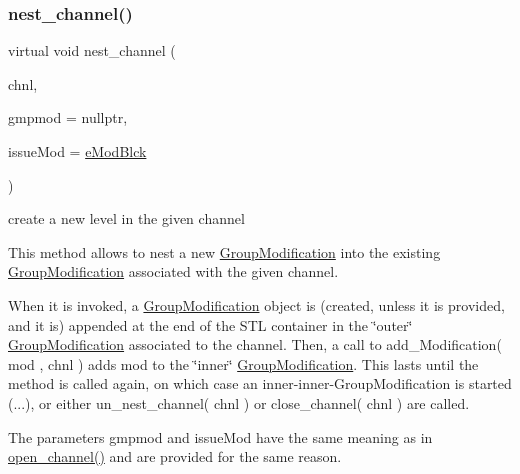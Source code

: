 \subsubsection{\texorpdfstring{nest\+\_\+channel()}{nest\_channel()}}
{\footnotesize\ttfamily virtual void nest\+\_\+channel (\begin{DoxyParamCaption}\item[{\mbox{\hyperlink{class_s_m_spp__di__unipi__it_1_1_observer_aa9ad8de42ffaf90023bfed5c085ad8bc}{c\+\_\+\+Chnl\+Name}}}]{chnl,  }\item[{\mbox{\hyperlink{class_s_m_spp__di__unipi__it_1_1_group_modification}{Group\+Modification}} $\ast$}]{gmpmod = {\ttfamily nullptr},  }\item[{\mbox{\hyperlink{group___modification___t_y_p_e_s_ga544246d8c462e9a2d817c2c30797968f}{c\+\_\+\+Mod\+Param}}}]{issue\+Mod = {\ttfamily \mbox{\hyperlink{group___modification___t_y_p_e_s_gga48fddcdd03a03f49b7e389ca1ed938d4a21b14b26b1c0093a0905f6fc010bad29}{e\+Mod\+Blck}}} }\end{DoxyParamCaption})\hspace{0.3cm}{\ttfamily [pure virtual]}}



create a new level in the given channel 

This method allows to nest a new \mbox{\hyperlink{class_s_m_spp__di__unipi__it_1_1_group_modification}{Group\+Modification}} into the existing \mbox{\hyperlink{class_s_m_spp__di__unipi__it_1_1_group_modification}{Group\+Modification}} associated with the given channel.

When it is invoked, a \mbox{\hyperlink{class_s_m_spp__di__unipi__it_1_1_group_modification}{Group\+Modification}} object is (created, unless it is provided, and it is) appended at the end of the S\+TL container in the \char`\"{}outer\char`\"{} \mbox{\hyperlink{class_s_m_spp__di__unipi__it_1_1_group_modification}{Group\+Modification}} associated to the channel. Then, a call to add\+\_\+\+Modification( mod , chnl ) adds mod to the \char`\"{}inner\char`\"{} \mbox{\hyperlink{class_s_m_spp__di__unipi__it_1_1_group_modification}{Group\+Modification}}. This lasts until the method is called again, on which case an inner-\/inner-\/\+Group\+Modification is started (...), or either un\+\_\+nest\+\_\+channel( chnl ) or close\+\_\+channel( chnl ) are called.

The parameters gmpmod and issue\+Mod have the same meaning as in \mbox{\hyperlink{class_s_m_spp__di__unipi__it_1_1_observer_acf7e46d450779f524e3655c5f31eecc8}{open\+\_\+channel()}} and are provided for the same reason.

